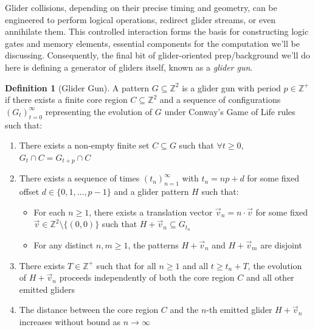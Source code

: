 \documentclass{article}
\theoremstyle{definition}
\newtheorem{definition}{Definition}[section]
\theoremstyle{plain}
\theoremstyle{plain}
\begin{document}

Glider collisions, depending on their precise timing and geometry, can be engineered to perform logical operations, redirect glider streams, or even annihilate them. This controlled interaction forms the basis for constructing logic gates and memory elements, essential components for the computation we'll be discussing. Consequently, the final bit of glider-oriented prep/background we'll do here is defining a generator of gliders itself, known as a \textit{glider gun}.

\begin{definition}[Glider Gun]
A pattern $G \subseteq \mathbb{Z}^2$ is a glider gun with period $p \in \mathbb{Z}^+$ if there exists a finite core region $C \subseteq \mathbb{Z}^2$ and a sequence of configurations $(G_t)_{t=0}^{\infty}$ representing the evolution of $G$ under Conway's Game of Life rules such that:
\begin{enumerate}
  \item There exists a non-empty finite set $C \subseteq G$ such that $\forall t \geq 0$, $G_t \cap C = G_{t+p} \cap C$
  
  \item There exists a sequence of times $(t_n)_{n=1}^{\infty}$ with $t_n = np + d$ for some fixed offset $d \in \{0, 1, \ldots, p-1\}$ and a glider pattern $H$ such that:
    \begin{itemize}
      \item For each $n \geq 1$, there exists a translation vector $\vec{v}_n = n \cdot \vec{v}$ for some fixed $\vec{v} \in \mathbb{Z}^2 \setminus \{(0,0)\}$ such that $H + \vec{v}_n \subseteq G_{t_n}$
      \item For any distinct $n, m \geq 1$, the patterns $H + \vec{v}_n$ and $H + \vec{v}_m$ are disjoint
    \end{itemize}
    
  \item There exists $T \in \mathbb{Z}^+$ such that for all $n \geq 1$ and all $t \geq t_n + T$, the evolution of $H + \vec{v}_n$ proceeds independently of both the core region $C$ and all other emitted gliders
  
  \item The distance between the core region $C$ and the $n$-th emitted glider $H + \vec{v}_n$ increases without bound as $n \to \infty$
\end{enumerate}
\end{definition}
\end{document}
